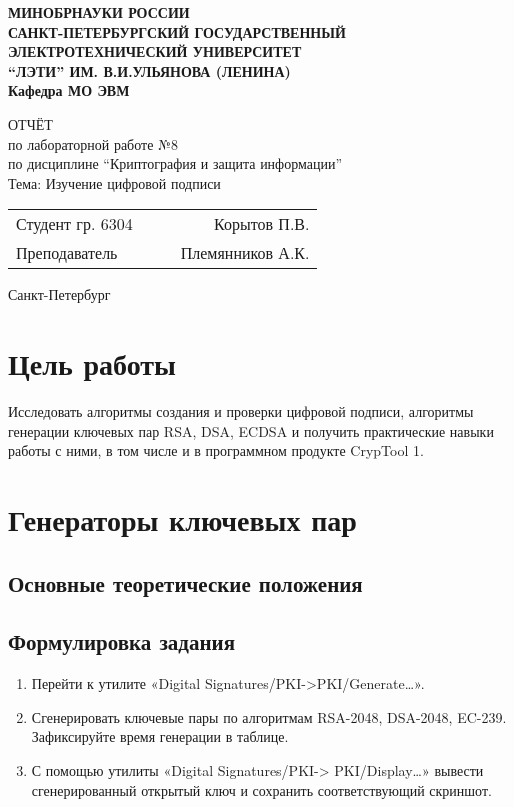 \documentclass[a4paper, 14pt]{extarticle}
\begin{document}
\begin{titlepage}
    \centering
    {\bfseries
        \uppercase{
            Минобрнауки России \\
            Санкт-Петербургский государственный \\
            Электротехнический университет \\
            \enquote{ЛЭТИ} им. В.И.Ульянова (Ленина)\\
        }
        Кафедра МО ЭВМ

        \vspace{\fill}
        \uppercase{Отчёт} \\
        по лабораторной работе №8 \\
        по дисциплине \enquote{Криптография и защита информации} \\
        Тема: Изучение цифровой подписи
    }

    \vspace{\fill}
    \begin{tabularx}{0.8\textwidth}{l X c r}
        Студент гр. 6304 & & \underline{\hspace{3cm}} & Корытов П.В.\\
        Преподаватель & & \underline{\hspace{3cm}} & Племянников А.К.
    \end{tabularx}

    \vspace{1cm}
    Санкт-Петербург \\
    \the\year{}
\end{titlepage}
\section*{Цель работы}
Исследовать алгоритмы создания и проверки цифровой подписи, алгоритмы генерации ключевых пар RSA, DSA, ECDSA и получить практические навыки работы с ними, в том числе и в программном продукте CrypTool 1.

\section{Генераторы ключевых пар}
\subsection{Основные теоретические положения}
\lipsum[1] %

\subsection{Формулировка задания}
\begin{enumerate}
    \item Перейти к утилите «Digital Signatures/PKI->PKI/Generate…».
    \item Сгенерировать ключевые пары по алгоритмам RSA-2048, DSA-2048, EC-239. Зафиксируйте время генерации в таблице.
    \item С помощью утилиты «Digital Signatures/PKI-> PKI/Display…» вывести сгенерированный открытый ключ и сохранить соответствующий скриншот.
\end{enumerate}
\end{document}
